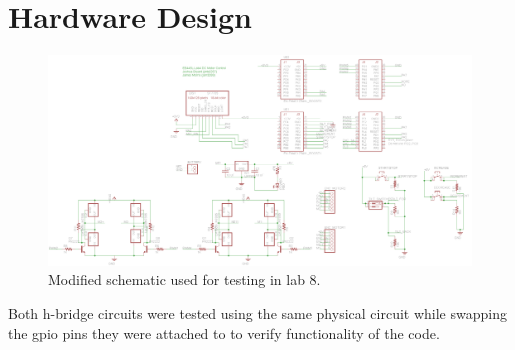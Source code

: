 \documentclass{article}
\begin{document}
\section{Hardware Design}
	\begin{figure}[h]
		\includegraphics[keepaspectratio, width=\textwidth]{Lab8Graphics/modifiedschematic.png}
		\caption{Modified schematic used for testing in lab 8.}
	\end{figure}
	Both h-bridge circuits were tested using the same physical circuit while swapping the gpio pins they were attached to to verify functionality of the code.



	

\end{document}
